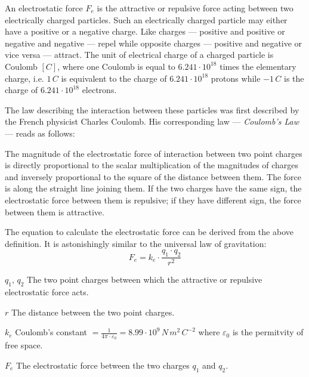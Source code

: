 



\thispagestyle{plain}



An electrostatic force $F_e$ is the attractive or repulsive force acting between two electrically charged particles. Such an electrically charged particle may either have a positive or a negative charge. Like charges --- positive and positive or negative and negative --- repel while opposite charges --- positive and negative or vice versa --- attract. The unit of electrical charge of a charged particle is Coulomb $[C]$, where one Coulomb is equal to $6.241 \cdot 10^{18}$ times the elementary charge, i.e. $1\, C$ is equivalent to the charge of $6.241 \cdot 10^{18}$ protons while $-1\, C$ is the charge of $6.241 \cdot 10^{18}$ electrons.

The law describing the interaction between these particles was first described by the French physicist Charles Coulomb. His corresponding law --- \emph{Coulomb's Law} --- reads as follows:

\begin{displayquote}
	The magnitude of the electrostatic force of interaction between two point charges is directly proportional to the scalar multiplication of the magnitudes of charges and inversely proportional to the square of the distance between them. The force is along the straight line joining them. If the two charges have the same sign, the electrostatic force between them is repulsive; if they have different sign, the force between them is attractive.
\end{displayquote}

The equation to calculate the electrostatic force can be derived from the above definition. It is astonishingly similar to the universal law of gravitation: $$F_e = k_e \cdot \frac{q_1 \cdot q_2}{r^2}$$

$q_1, \, q_2$  The two point charges between which the attractive or repulsive electrostatic force acts.

$r$  The distance between the two point charges.

$k_e$  Coulomb's constant $ = \frac{1}{4 \pi \cdot \varepsilon_0} = 8.99 \cdot 10^{9} \, N\, m^2 \, C^{-2}$ where $\varepsilon_0$ is the permitvity of free space.

$F_e$  The electrostatic force between the two charges $q_1$ and $q_2$.

